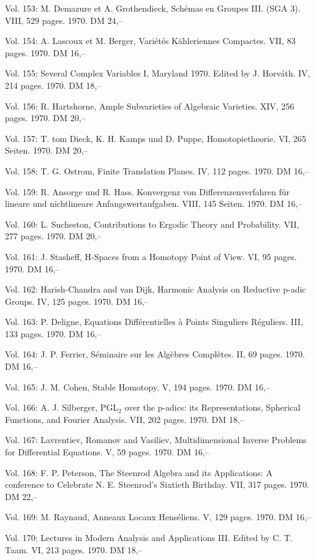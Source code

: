 Vol. 153: M. Demazure et A. Grothendieck, Schémas en Groupes III. (SGA 3). VIII, 529 pages. 1970. DM 24,--

Vol. 154: A. Lascoux et M. Berger, Variétés Kähleriennes Compactes. VII, 83 pages. 1970. DM 16,--

Vol. 155: Several Complex Variables I, Maryland 1970. Edited by J. Horváth. IV, 214 pages. 1970. DM 18,--

Vol. 156: R. Hartshorne, Ample Subvarieties of Algebraic Varieties. XIV, 256 pages. 1970. DM 20,--

Vol. 157: T. tom Dieck, K. H. Kamps und D. Puppe, Homotopietheorie. VI, 265 Seiten. 1970. DM 20,--

Vol. 158: T. G. Ostrom, Finite Translation Planes. IV. 112 pages. 1970. DM 16,--

Vol. 159: R. Ansorge und R. Hass. Konvergenz von Differenzenverfahren für lineare und nichtlineare Anfangswertaufgaben. VIII, 145 Seiten. 1970. DM 16,--

Vol. 160: L. Sucheston, Contributions to Ergodic Theory and Probability. VII, 277 pages. 1970. DM 20,--

Vol. 161: J. Stasheff, H-Spaces from a Homotopy Point of View. VI, 95 pages. 1970. DM 16,--

Vol. 162: Harish-Chandra and van Dijk, Harmonic Analysis on Reductive p-adic Groups. IV, 125 pages. 1970. DM 16,--

Vol. 163: P. Deligne, Equations Différentielles à Points Singuliers Réguliers. III, 133 pages. 1970. DM 16,--

Vol. 164: J. P. Ferrier, Séminaire sur les Algèbres Complètes. II, 69 pages. 1970. DM 16,--

Vol. 165: J. M. Cohen, Stable Homotopy. V, 194 pages. 1970. DM 16,--

Vol. 166: A. J. Silberger, PGL$_2$ over the p-adics: its Representations, Spherical Functions, and Fourier Analysis. VII, 202 pages. 1970. DM 18,--

Vol. 167: Lavrentiev, Romanov and Vasiliev, Multidimensional Inverse Problems for Differential Equations. V, 59 pages. 1970. DM 16,--

Vol. 168: F. P. Peterson, The Steenrod Algebra and its Applications: A conference to Celebrate N. E. Steenrod's Sixtieth Birthday. VII, 317 pages. 1970. DM 22,--

Vol. 169: M. Raynaud, Anneaux Locaux Henséliens. V, 129 pages. 1970. DM 16,--

Vol. 170: Lectures in Modern Analysis and Applications III. Edited by C. T. Taam. VI, 213 pages. 1970. DM 18,--

